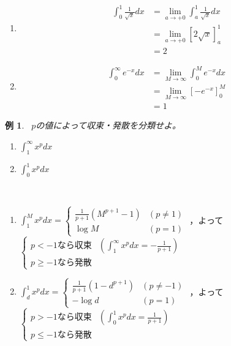 \documentclass[dvipdfmx,a4j,10pt]{jsarticle}
\makeatletter
\theoremstyle{mystyle1}
\newtheorem{example}[dfn]{例}
\theoremstyle{mystyle2}
\newtheorem{ans}{解答}
\renewenvironment{ans}[1][解答]{\par
  \pushQED{\qed}%
  \normalfont
  \topsep6\p@\@plus6\p@ \trivlist
  \item[\hskip\labelsep{\bfseries\sffamily #1}]\ignorespaces
}{%
  \popQED\endtrivlist\@endpefalse
}
\makeatother
\begin{document}
\begin{ans}[解答\ref{ex2.44}]\
	\begin{enumerate}
		\item
		\[
		\begin{split}
		\int_0^1\frac{1}{\sqrt{x}}dx
		&=\lim_{a\to+0}\int_a^1\frac{1}{\sqrt{x}}dx\\
		&=\lim_{a\to+0}[2\sqrt{x}]_a^1\\
		&=2
		\end{split}
		\]
		\item
		\[
		\begin{split}
		\int_0^\infty e^{-x}dx
		&=\lim_{M\to\infty}\int_0^M e^{-x}dx\\
		&=\lim_{M\to\infty}[-e^{-x}]_0^M\\
		&=1
		\end{split}
		\]
	\end{enumerate}
\end{ans}

\newpage

\begin{shaded}
\begin{example}\ $p$の値によって収束・発散を分類せよ。
\begin{enumerate}
\item $\displaystyle \int_1^\infty x^p dx$
\item $\displaystyle \int_0^1 x^p dx$
\end{enumerate}
\end{example}
\end{shaded}

\begin{ans}[例題の解答]\
    \begin{enumerate}
        \item
        $\displaystyle\int_1^M x^p dx=
        \begin{cases}
        \displaystyle\frac{1}{p+1}(M^{p+1}-1) & (p\neq1)\\
        \log{M} & (p=1)
        \end{cases}
        $
        ，よって
        $
        \begin{cases}
        p<-1なら収束 & \left(\int_1^\infty x^p dx=-\displaystyle\frac{1}{p+1}\right)\\
        p\geq-1なら発散 & \
        \end{cases}
        $
        \item
        $\displaystyle\int_d^1 x^p dx=
        \begin{cases}
        \displaystyle\frac{1}{p+1}(1-d^{p+1}) & (p\neq-1)\\
        -\log{d} & (p=1)
        \end{cases}
        $
        ，よって
        $
        \begin{cases}
        p>-1なら収束 & \displaystyle\left(\int_0^1 x^p dx=\frac{1}{p+1}\right)\\
        p\leq-1なら発散 & \
        \end{cases}
        $
    \end{enumerate}
\end{ans}
\end{document}

